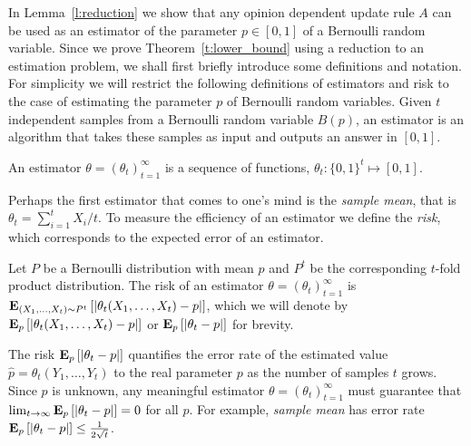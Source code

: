 In Lemma~\ref{l:reduction} we show that any opinion dependent update rule $A$
can be used as an estimator of the parameter $p \in [0,1] $ of a Bernoulli random
variable.
Since we prove Theorem~\ref{t:lower_bound} using a reduction to
an estimation problem, we shall first briefly introduce some definitions and
notation. For simplicity we will restrict the following definitions
of estimators and risk to the case of estimating the parameter $p$ of Bernoulli
random variables.
Given $t$ independent samples from a Bernoulli random variable $B(p)$,
an estimator is an algorithm that takes these samples as input and
outputs an answer in $[0,1]$.
\begin{definition}\label{d:estimator}
  An estimator $\theta=(\theta_t)_{t=1}^{\infty}$
  is a sequence of functions, $\theta_t: \{0,1\}^t\mapsto [0,1]$.
\end{definition}
Perhaps the first estimator that comes to one's mind is the
\emph{sample mean}, that is $\theta_t = \sum_{i=1}^t X_i/t$.
To measure the efficiency of an estimator we define the \emph{risk},
which corresponds to the expected error of an estimator.
\begin{definition}\label{d:risk}
  Let $P$ be a Bernoulli distribution with mean $p$ and
  $P^t$ be the corresponding $t$-fold product distribution.
  The risk of an estimator $\theta =(\theta_t)_{t=1}^\infty$ is
  $\bm{\mathrm{E}}_{(X_1,\ldots,X_t) \sim P^t} \left[ |\theta_t(X_1,\ldots,X_t) - p| \right]$,
  which we will denote by
  $\bm{\mathrm{E}}_{p} \left[ |\theta_t(X_1,\ldots,X_t) - p| \right]$ or
  $\bm{\mathrm{E}}_{p} \left[ |\theta_t - p| \right]$ for brevity.
\end{definition}
The risk $\bm{\mathrm{E}}_{p} \left[ |\theta_t - p| \right]$ quantifies the error rate of
the estimated value $\hat{p} =\theta_t(Y_1,\ldots,Y_t)$ to the
real parameter $p$ as the number of samples $t$ grows.
Since $p$ is unknown, any meaningful estimator $\theta=(\theta_t)_{t=1}^\infty$
must guarantee that $\lim_{t \to \infty} \bm{\mathrm{E}}_{p} \left[ |\theta_t - p| \right]=0$ for all $p$.
For example, \emph{sample mean} has error rate
$\bm{\mathrm{E}}_{p} \left[ |\theta_t-p| \right] \leq \frac{1}{2\sqrt{t}}$.

